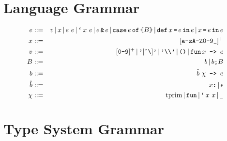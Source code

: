 \documentclass{article}
\begin{document}
\section*{Language Grammar}

\begin{eqnarray*}
    e               &::=&       v
                           \gOr x
                           \gOr e\ e
                           \gOr \gtBt x\ e
                           \gOr e \gtAmp e
                           \gOr \gtCase e \gtOf \texttt{\char`\{} B \texttt{\char`\}}
                           \gOr \gtDef x \gtEq e \gtIn e
                           \gOr x \gtEq e \gtIn e
\\
    x               &::=&       [\texttt{a-zA-Z0-9\char`\_}]^+
\\
    v               &::=&       [\texttt{0-9}]^+
                           \gOr \texttt{'}[\texttt{\textrm{\^{}}\char`\\}]\texttt{'}
                           \gOr \texttt{'\char`\\\char`\\'}
                           \gOr \texttt{()}
                           \gOr \gtFun x\texttt{ -> }e
\\
    B               &::=&       b
                           \gOr b\texttt{\char`\; }B
\\
    b               &::=&       \hat{b}\ \chi\texttt{ -> }e
\\
    \hat{b}         &::=&       x\texttt{:}
                           \gOr \epsilon
\\
    \chi            &::=&       \tprim
                           \gOr \gtFun
                           \gOr \gtBt x\ x
                           \gOr \texttt{\char`\_}
\end{eqnarray*}


\section*{Type System Grammar}
\end{document}
